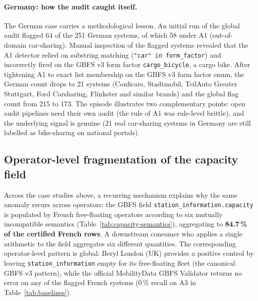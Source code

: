 \documentclass[11pt,a4paper]{article}
\begin{document}
\paragraph{Germany: how the audit caught itself.}
The German case carries a methodological lesson. An initial run of
the global audit flagged 64 of the 251 German systems, of which 58
under A1 (out-of-domain car-sharing). Manual inspection of the
flagged systems revealed that the A1 detector relied on substring
matching (\texttt{"car" in form\_factor}) and incorrectly fired on
the GBFS v3 form factor \texttt{cargo\_bicycle}, a cargo bike. After
tightening A1 to exact list membership on the GBFS v3 form factor
enum, the German count drops to 21 systems (Conficars, Stadtmobil,
TeilAuto Greater Stuttgart, Ford Carsharing, Flinkster and similar
brands) and the global flag count from 215 to 173. The episode
illustrates two complementary points: open audit pipelines need
their own audit (the rule of A1 was rule-level brittle), and the
underlying signal is genuine (21 real car-sharing systems in
Germany are still labelled as bike-sharing on national portals).

\subsection{Operator-level fragmentation of the capacity field}
Across the case studies above, a recurring mechanism explains why
the same anomaly recurs across operators: the GBFS field
\texttt{station\_information.capacity} is populated by French
free-floating operators according to six mutually incompatible
semantics (Table~\ref{tab:capacity-semantics}), aggregating to
\textbf{84.7\,\% of the certified French rows}. A downstream
consumer who applies a single arithmetic to the field aggregates
six different quantities. The corresponding operator-level pattern
is global: Beryl London (UK) provides a positive control by leaving
\texttt{station\_information} empty for its free-floating fleet
(the canonical GBFS v3 pattern), while the official MobilityData
GBFS Validator \cite{MobilityData2024Validator} returns no error
on any of the flagged French systems (0\,\% recall on A3 in
Table~\ref{tab:baselines}).
\end{document}

